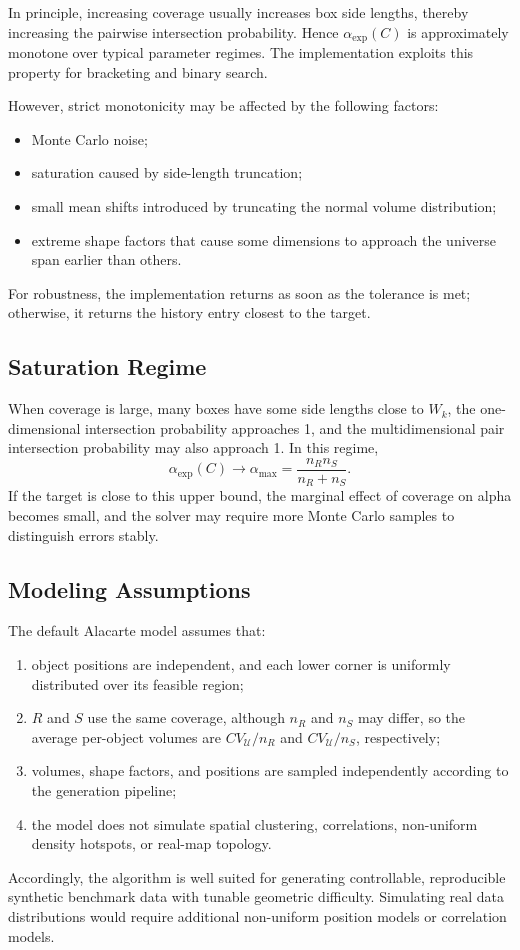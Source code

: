 \documentclass[11pt,a4paper]{article}
\newcommand{\Uset}{\mathcal{U}}
\begin{document}
In principle, increasing coverage usually increases box side lengths, thereby increasing the pairwise intersection probability. Hence $\alpha_{\mathrm{exp}}(C)$ is approximately monotone over typical parameter regimes. The implementation exploits this property for bracketing and binary search.

However, strict monotonicity may be affected by the following factors:
\begin{itemize}
  \item Monte Carlo noise;
  \item saturation caused by side-length truncation;
  \item small mean shifts introduced by truncating the normal volume distribution;
  \item extreme shape factors that cause some dimensions to approach the universe span earlier than others.
\end{itemize}
For robustness, the implementation returns as soon as the tolerance is met; otherwise, it returns the history entry closest to the target.

\subsection{Saturation Regime}

When coverage is large, many boxes have some side lengths close to $W_k$, the one-dimensional intersection probability approaches 1, and the multidimensional pair intersection probability may also approach 1. In this regime,
\[
  \alpha_{\mathrm{exp}}(C)
  \to
  \alpha_{\max}
  =
  \frac{n_Rn_S}{n_R+n_S}.
\]
If the target is close to this upper bound, the marginal effect of coverage on alpha becomes small, and the solver may require more Monte Carlo samples to distinguish errors stably.

\subsection{Modeling Assumptions}

The default Alacarte model assumes that:
\begin{enumerate}
  \item object positions are independent, and each lower corner is uniformly distributed over its feasible region;
  \item $R$ and $S$ use the same coverage, although $n_R$ and $n_S$ may differ, so the average per-object volumes are $CV_{\Uset}/n_R$ and $CV_{\Uset}/n_S$, respectively;
  \item volumes, shape factors, and positions are sampled independently according to the generation pipeline;
  \item the model does not simulate spatial clustering, correlations, non-uniform density hotspots, or real-map topology.
\end{enumerate}
Accordingly, the algorithm is well suited for generating controllable, reproducible synthetic benchmark data with tunable geometric difficulty. Simulating real data distributions would require additional non-uniform position models or correlation models.
\end{document}
